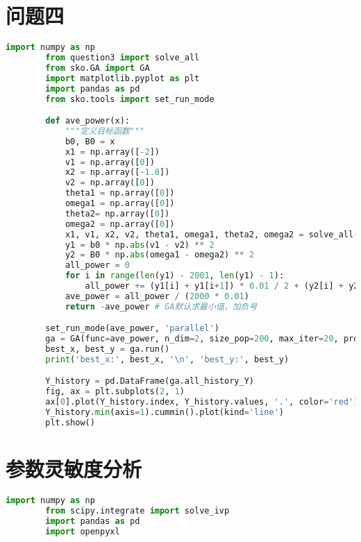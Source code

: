 \documentclass[withoutpreface,bwprint]{cumcmthesis} %
\begin{document}
\begin{appendices}
        \section{问题四}
        \begin{lstlisting}[language=python]
        import numpy as np
        from question3 import solve_all
        from sko.GA import GA
        import matplotlib.pyplot as plt
        import pandas as pd
        from sko.tools import set_run_mode

        def ave_power(x):
            """定义目标函数"""
            b0, B0 = x
            x1 = np.array([-2])
            v1 = np.array([0])
            x2 = np.array([-1.8])
            v2 = np.array([0])
            theta1 = np.array([0])
            omega1 = np.array([0])
            theta2= np.array([0])
            omega2 = np.array([0])
            x1, v1, x2, v2, theta1, omega1, theta2, omega2 = solve_all(x1, v1, x2, v2, theta1, omega1, theta2, omega2, m3=1091.099, J3=7142.493, omega=1.9806, f=1760, L=2140, b1=528.5018, B1=1655.909, b0=b0, B0=B0)
            y1 = b0 * np.abs(v1 - v2) ** 2
            y2 = B0 * np.abs(omega1 - omega2) ** 2
            all_power = 0
            for i in range(len(y1) - 2001, len(y1) - 1):
                all_power += (y1[i] + y1[i+1]) * 0.01 / 2 + (y2[i] + y2[i+1]) * 0.01 / 2
            ave_power = all_power / (2000 * 0.01)
            return -ave_power # GA默认求最小值，加负号

        set_run_mode(ave_power, 'parallel')
        ga = GA(func=ave_power, n_dim=2, size_pop=200, max_iter=20, prob_mut=0.001, lb=[55000, 0], ub=[65000, 100000], precision=1e-7)
        best_x, best_y = ga.run()
        print('best_x:', best_x, '\n', 'best_y:', best_y)

        Y_history = pd.DataFrame(ga.all_history_Y)
        fig, ax = plt.subplots(2, 1)
        ax[0].plot(Y_history.index, Y_history.values, '.', color='red')
        Y_history.min(axis=1).cummin().plot(kind='line')
        plt.show()

        \end{lstlisting}

        \section{参数灵敏度分析}
        \begin{lstlisting}[language=python]
        import numpy as np
        from scipy.integrate import solve_ivp
        import pandas as pd
        import openpyxl


\end{lstlisting}
\end{appendices}
\end{document}
